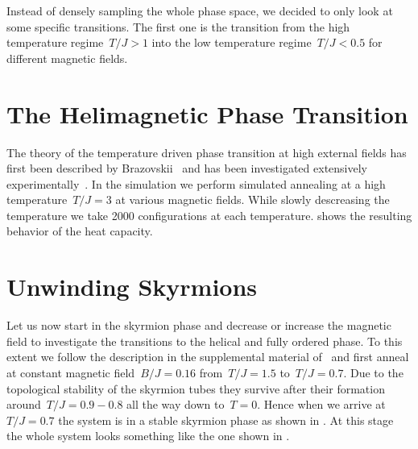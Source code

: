 Instead of densely sampling the whole phase space, we decided to only look at
some specific transitions. The first one is the transition from the high
temperature regime~$T/J > 1$ into the low temperature regime~$T/J < 0.5$ for
different magnetic fields.

\section{The Helimagnetic Phase Transition}\label{sec:details}
%
The theory of the temperature driven phase transition at high external fields
has first been described by Brazovskii~\cite{brazovskii} and has been
investigated extensively experimentally~\cite{exp1, exp2, exp3, exp4, exp5,
exp6}. In the simulation we perform simulated annealing at a high
temperature~$T/J = 3$ at various magnetic fields. While slowly descreasing the
temperature we take 2000 configurations at each temperature. 
shows the resulting behavior of the heat capacity.

%
\section{Unwinding Skyrmions}\label{sec:transitions}
%
Let us now start in the skyrmion phase and decrease or increase the magnetic
field to investigate the transitions to the helical and fully ordered phase. To
this extent we follow the description in the supplemental material
of~\cite{Milde} and first anneal at constant magnetic field~$B/J=0.16$
from~$T/J=1.5$ to~$T/J=0.7$. Due to the topological stability of the skyrmion
tubes they survive after their formation around~$T/J = 0.9 - 0.8$ all the way
down to~$T=0$. Hence when we arrive at~$T/J=0.7$ the system is in a stable
skyrmion phase as shown in . At this stage the whole
system looks something like the one shown in .

